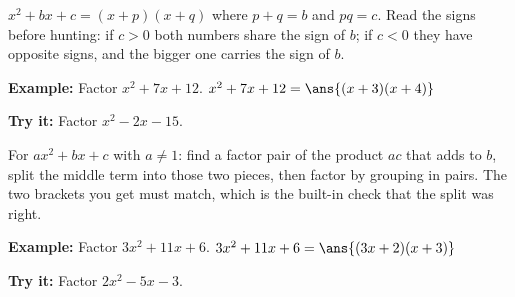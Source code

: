 \documentclass[12pt]{article}
\begin{document}

\begin{formulabox}
$x^2 + bx + c = (x + p)(x + q)$ where $p + q = b$ and $pq = c$. Read the signs
before hunting: if $c > 0$ both numbers share the sign of $b$; if $c < 0$ they
have opposite signs, and the bigger one carries the sign of $b$.
\end{formulabox}

\begin{examplebox}
\textbf{Example:} Factor $x^2 + 7x + 12$.
$x^2 + 7x + 12 = \ans{(x+3)(x+4)}$
\end{examplebox}

\begin{tryitbox}
\textbf{Try it:} Factor $x^2 - 2x - 15$.\\[2pt]
\end{tryitbox}


\begin{formulabox}
For $ax^2 + bx + c$ with $a \neq 1$: find a factor pair of the product $ac$ that
adds to $b$, split the middle term into those two pieces, then factor by
grouping in pairs. The two brackets you get must match, which is the built-in
check that the split was right.
\end{formulabox}

\begin{examplebox}
\textbf{Example:} Factor $3x^2 + 11x + 6$.
$3x^2 + 11x + 6 = \ans{(3x+2)(x+3)}$
\end{examplebox}

\begin{tryitbox}
\textbf{Try it:} Factor $2x^2 - 5x - 3$.\\[2pt]
\end{tryitbox}

\end{document}

